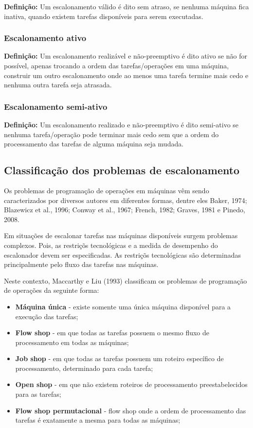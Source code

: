 \textbf{Definição:} Um escalonamento válido é dito sem atraso, se nenhuma máquina fica inativa, quando existem tarefas disponíveis para serem executadas.

\subsubsection{Escalonamento ativo}

\textbf{Definição:} Um escalonamento realizável e não-preemptivo é dito ativo se não for possível, apenas trocando a ordem das tarefas/operações em uma máquina, construir um outro escalonamento onde ao menos uma tarefa termine mais cedo e nenhuma outra tarefa seja atrasada.

\subsubsection{Escalonamento semi-ativo}

\textbf{Definição:} Um escalonamento realizado e não-preemptivo é dito semi-ativo se nenhuma tarefa/operação pode terminar mais cedo sem que a ordem do processamento das tarefas de alguma máquina seja mudada.


\subsection{Classificação dos problemas de escalonamento}
Os problemas de programação de operações em máquinas vêm sendo caracterizados por diversos autores em diferentes formas, dentre eles Baker, 1974; Blazewicz et al., 1996; Conway et al., 1967; French, 1982; Graves, 1981 e Pinedo, 2008.

Em situações de escalonar tarefas nas máquinas disponíveis surgem problemas complexos. Pois, as restriçõs tecnológicas e a medida de desempenho do escalonador devem ser especificadas. As restriçõs tecnológicas são determinadas principalmente pelo fluxo das tarefas nas máquinas.

Neste contexto, Maccarthy e Liu (1993) classificam os problemas de programação de operações da seguinte forma:
 
\begin{itemize}
\item \textbf{Máquina única} - existe somente uma única máquina disponível para a execução das tarefas;
\item \textbf{Flow shop} - em que todas as tarefas possuem o mesmo fluxo de processamento em todas as máquinas;
 \item \textbf{Job shop} - em que todas as tarefas possuem um roteiro específico de processamento, determinado para cada tarefa;
 \item \textbf{Open shop} - em que não existem roteiros de processamento preestabelecidos para as tarefas;
 \item \textbf{Flow shop permutacional} - flow shop onde a ordem de processamento das tarefas é exatamente a mesma para todas as máquinas;
\end{itemize}

